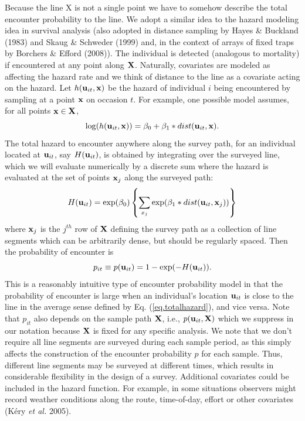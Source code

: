 Because the line X is not a single point we have to somehow describe
the total encounter probability to the line. We adopt a similar idea
to the hazard modeling idea in survival analysis (also adopted in
distance sampling by Hayes \& Buckland (1983) and Skaug \& Schweder
(1999) and, in the context of arrays of fixed traps by Borchers \&
Efford (2008)).  The individual is detected (analogous to mortality)
if encountered at any point along ${\bf X}$. Naturally, covariates are
modeled as affecting the hazard rate and we think of distance to the
line as a covariate acting on the hazard. Let $h({\bf u}_{it},{\bf
  x})$ be the hazard of individual $i$ being encountered by sampling
at a point ${\bf x}$ on occasion $t$.  For example, one possible model
assumes, for all points ${\bf x} \in {\bf X}$,
\begin{equation}
\log(h({\bf u}_{it},{\bf x})) = \beta_{0} + \beta_{1}*dist({\bf u}_{it},{\bf x}).
\label{eq.hazard}
\end{equation}
The total hazard to encounter anywhere along the survey path, for an
individual located at ${\bf u}_{it}$, say $H({\bf u}_{it})$, is
obtained by integrating over the surveyed line, which we will evaluate
numerically by a discrete sum where the hazard is evaluated at the set
of points ${\bf x}_{j}$ along the surveyed path:
\begin{equation}
H({\bf u}_{it}) =  \exp(\beta_{0}) \left\{ \sum_{x_{j}}  \exp(\beta_{1}*dist({\bf
    u}_{it},{\bf x}_{j})) \right\}
\label{eq.totalhazard}
\end{equation}
where ${\bf x}_{j}$ is the $j^{th}$ row of ${\bf X}$ defining the
survey path as a collection of line segments which can be arbitrarily
dense, but should be regularly spaced.  Then the probability of
encounter is
\begin{equation}
p_{it} \equiv p({\bf u}_{it}) = 1- \exp(-H({\bf u}_{it})).
\label{eq.encounterprob}
\end{equation}
This is a reasonably intuitive type of encounter probability model in
that the probability of encounter is large when an individual's
location ${\bf u}_{it}$ is close to the line in the average sense
defined by Eq. (\ref{eq.totalhazard}), and vice versa. Note that
$p_{it}$ also depends on the sample path ${\bf X}$, i.e., $p({\bf
  u}_{it}, {\bf X})$ which we suppress in our notation because ${\bf
  X}$ is fixed for any specific analysis.  We note that we don't
require all line segments are surveyed during each sample period, as
this simply affects the construction of the encounter probability $p$
for each sample. Thus, different line segments may be surveyed at
different times, which results in considerable flexibility in the
design of a survey. Additional covariates could be included in the
hazard function. For example, in some situations observers might
record weather conditions along the route, time-of-day, effort or
other covariates (K\'{e}ry {\it et al.} 2005).

